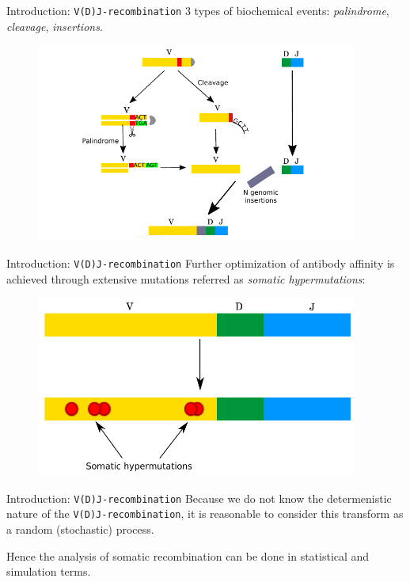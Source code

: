 \documentclass{beamer}\usepackage[]{graphicx}\usepackage[]{color}
\begin{document}
\begin{frame}{Introduction: \texttt{V(D)J-recombination}}
  3 types of biochemical events: \textit{palindrome}, \textit{cleavage}, \textit{insertions}. 
  \begin{figure}[h]
    \center\includegraphics[width=300pt]{Pictures/vdj3_DJ_aligned.pdf}
 \end{figure}
\end{frame}

\begin{frame}{Introduction: \texttt{V(D)J-recombination}}
  Further optimization of antibody affinity is achieved through extensive mutations referred as \textit{somatic hypermutations}:
  \begin{figure}[h]
    \center\includegraphics[width=300pt]{Pictures/somatic_mutations.pdf}
 \end{figure}
\end{frame}

\begin{frame}{Introduction: \texttt{V(D)J-recombination}}
  Because we do not know the determenistic nature of the \texttt{V(D)J-recombination}, it is reasonable
  to consider this transform as a {\color{blue} random} (stochastic) process.

  \bigskip
  Hence the analysis of somatic recombination can be done in statistical and simulation terms. 
\end{frame}
\end{document}
